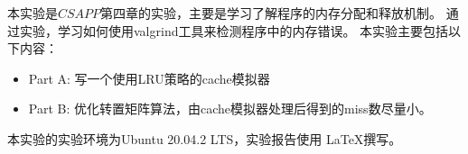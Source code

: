 本实验是$ CSAPP $第四章的实验，主要是学习了解程序的内存分配和释放机制。
通过实验，学习如何使用valgrind工具来检测程序中的内存错误。
本实验主要包括以下内容：
\begin{itemize}
    \item Part A: 写一个使用LRU策略的cache模拟器
    \item Part B: 优化转置矩阵算法，由cache模拟器处理后得到的miss数尽量小。
\end{itemize}

本实验的实验环境为Ubuntu 20.04.2 LTS，实验报告使用 \LaTeX 撰写。